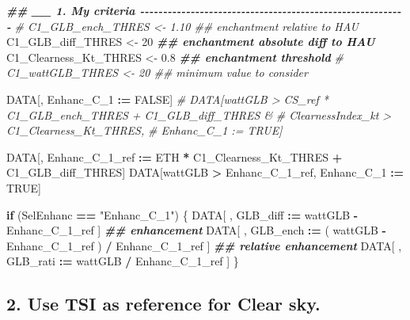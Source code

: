 \documentclass[
  10pt,
  a4paper,oneside]{article}
\newenvironment{Shaded}{\begin{snugshade}}{\end{snugshade}}
\newcommand{\CommentTok}[1]{\textcolor[rgb]{0.56,0.35,0.01}{\textit{#1}}}
\newcommand{\ConstantTok}[1]{\textcolor[rgb]{0.56,0.35,0.01}{#1}}
\newcommand{\ControlFlowTok}[1]{\textcolor[rgb]{0.13,0.29,0.53}{\textbf{#1}}}
\newcommand{\DecValTok}[1]{\textcolor[rgb]{0.00,0.00,0.81}{#1}}
\newcommand{\DocumentationTok}[1]{\textcolor[rgb]{0.56,0.35,0.01}{\textbf{\textit{#1}}}}
\newcommand{\FloatTok}[1]{\textcolor[rgb]{0.00,0.00,0.81}{#1}}
\newcommand{\NormalTok}[1]{#1}
\newcommand{\OtherTok}[1]{\textcolor[rgb]{0.56,0.35,0.01}{#1}}
\newcommand{\SpecialCharTok}[1]{\textcolor[rgb]{0.81,0.36,0.00}{\textbf{#1}}}
\newcommand{\StringTok}[1]{\textcolor[rgb]{0.31,0.60,0.02}{#1}}
\begin{document}
\begin{Shaded}
\begin{Highlighting}[]
\DocumentationTok{\#\# \_\_ 1. My criteria  {-}{-}{-}{-}{-}{-}{-}{-}{-}{-}{-}{-}{-}{-}{-}{-}{-}{-}{-}{-}{-}{-}{-}{-}{-}{-}{-}{-}{-}{-}{-}{-}{-}{-}{-}{-}{-}{-}{-}{-}{-}{-}{-}{-}{-}{-}{-}{-}{-}{-}{-}{-}{-}{-}{-}{-}{-}{-}}
\CommentTok{\# C1\_GLB\_ench\_THRES     \textless{}{-}  1.10 \#\# enchantment relative to HAU}
\NormalTok{C1\_GLB\_diff\_THRES     }\OtherTok{\textless{}{-}} \DecValTok{20}    \DocumentationTok{\#\# enchantment absolute diff to HAU}
\NormalTok{C1\_Clearness\_Kt\_THRES }\OtherTok{\textless{}{-}}  \FloatTok{0.8}  \DocumentationTok{\#\# enchantment threshold}
\CommentTok{\# C1\_wattGLB\_THRES      \textless{}{-} 20    \#\# minimum value to consider}

\NormalTok{DATA[, Enhanc\_C\_1 }\SpecialCharTok{:=} \ConstantTok{FALSE}\NormalTok{]}
\CommentTok{\# DATA[wattGLB           \textgreater{} CS\_ref * C1\_GLB\_ench\_THRES + C1\_GLB\_diff\_THRES \&}
\CommentTok{\#      ClearnessIndex\_kt \textgreater{} C1\_Clearness\_Kt\_THRES,}
\CommentTok{\#      Enhanc\_C\_1 := TRUE]}

\NormalTok{DATA[, Enhanc\_C\_1\_ref }\SpecialCharTok{:=}\NormalTok{ ETH }\SpecialCharTok{*}\NormalTok{ C1\_Clearness\_Kt\_THRES }\SpecialCharTok{+}\NormalTok{ C1\_GLB\_diff\_THRES]}
\NormalTok{DATA[wattGLB }\SpecialCharTok{\textgreater{}}\NormalTok{ Enhanc\_C\_1\_ref,}
\NormalTok{     Enhanc\_C\_1 }\SpecialCharTok{:=} \ConstantTok{TRUE}\NormalTok{]}

\ControlFlowTok{if}\NormalTok{ (SelEnhanc }\SpecialCharTok{==} \StringTok{"Enhanc\_C\_1"}\NormalTok{) \{}
\NormalTok{  DATA[ , GLB\_diff }\SpecialCharTok{:=}\NormalTok{   wattGLB }\SpecialCharTok{{-}}\NormalTok{ Enhanc\_C\_1\_ref                    ] }\DocumentationTok{\#\# enhancement}
\NormalTok{  DATA[ , GLB\_ench }\SpecialCharTok{:=}\NormalTok{ ( wattGLB }\SpecialCharTok{{-}}\NormalTok{ Enhanc\_C\_1\_ref ) }\SpecialCharTok{/}\NormalTok{ Enhanc\_C\_1\_ref ] }\DocumentationTok{\#\# relative enhancement}
\NormalTok{  DATA[ , GLB\_rati }\SpecialCharTok{:=}\NormalTok{   wattGLB }\SpecialCharTok{/}\NormalTok{ Enhanc\_C\_1\_ref                    ]}
\NormalTok{\}}
\end{Highlighting}
\end{Shaded}

\hypertarget{use-tsi-as-reference-for-clear-sky.-1}{%
\subsection{2. Use TSI as reference for Clear sky.}\label{use-tsi-as-reference-for-clear-sky.-1}}
\end{document}
